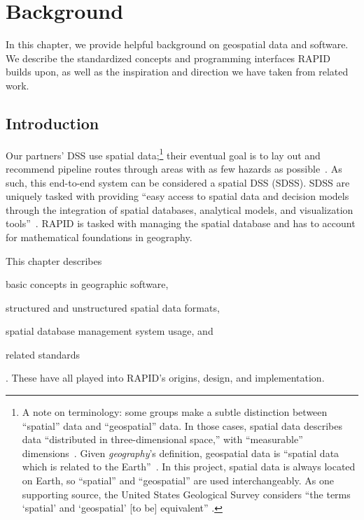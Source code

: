 \chapter{Background}
\label{background}

In this chapter, we provide helpful background on geospatial data and software. We describe the standardized concepts and programming interfaces RAPID builds upon, as well as the inspiration and direction we have taken from related work.

\section{Introduction}
\label{background_intro}
Our partners' DSS use spatial data;\footnote{A note on terminology: some groups make a subtle distinction between ``spatial'' data and ``geospatial'' data. In those cases, spatial data describes data ``distributed in three-dimensional space,'' with ``measurable'' dimensions~\cite{Bhatta2011}. Given \textit{geography}'s definition, geospatial data is ``spatial data which is related to the Earth''~\cite{Bhatta2011}. In this project, spatial data is always located on Earth, so ``spatial'' and ``geospatial'' are used interchangeably. As one supporting source, the United States Geological Survey considers ``the terms `spatial' and `geospatial' [to be] equivalent''
\cite{Bhatta2011}.} their eventual goal is to lay out and recommend pipeline routes through areas with as few hazards as possible~\cite{Dunning2013}. As such, this end-to-end system can be considered a spatial DSS (SDSS). SDSS are uniquely tasked with providing ``easy access to spatial data and decision models through the integration of spatial databases, analytical models, and visualization tools''~\cite{RedlandsSDSS}. RAPID is tasked with managing the spatial database and has to account for mathematical foundations in geography.

This chapter describes \begin{enumerate*}[label=\itshape\alph*\upshape)]
\item basic concepts in geographic software,
\item structured and unstructured spatial data formats,
\item spatial database management system usage, and
\item related standards
\end{enumerate*}. These have all played into RAPID's origins, design, and implementation.

